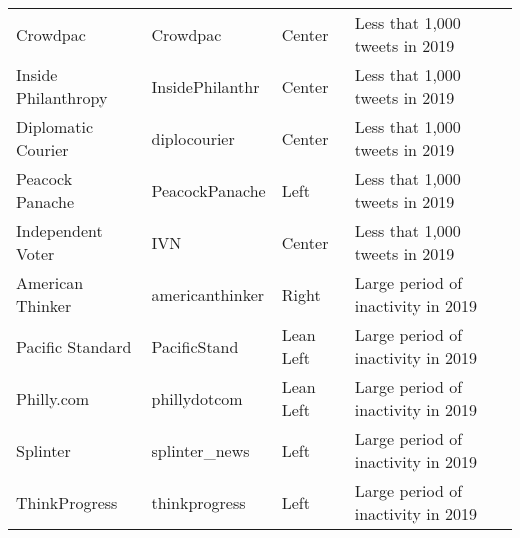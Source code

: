 \begin{tabular}{llll}
             Crowdpac &         Crowdpac &        Center &      Less that 1,000 tweets in 2019 \\
  Inside Philanthropy &  InsidePhilanthr &        Center &      Less that 1,000 tweets in 2019 \\
   Diplomatic Courier &     diplocourier &        Center &      Less that 1,000 tweets in 2019 \\
      Peacock Panache &   PeacockPanache &          Left &      Less that 1,000 tweets in 2019 \\
    Independent Voter &              IVN &        Center &      Less that 1,000 tweets in 2019 \\
     American Thinker &  americanthinker &         Right &  Large period of inactivity in 2019 \\
     Pacific Standard &     PacificStand &     Lean Left &  Large period of inactivity in 2019 \\
           Philly.com &     phillydotcom &     Lean Left &  Large period of inactivity in 2019 \\
             Splinter &    splinter\_news &          Left &  Large period of inactivity in 2019 \\
        ThinkProgress &    thinkprogress &          Left &  Large period of inactivity in 2019 \\
\bottomrule
\end{tabular}
